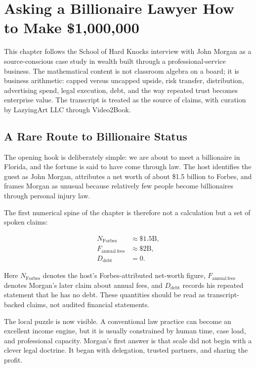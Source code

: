 \chapter{Asking a Billionaire Lawyer How to Make \$1,000,000}

This chapter follows the School of Hard Knocks interview with John Morgan as a source-conscious case study in wealth built through a professional-service business. The mathematical content is not classroom algebra on a board; it is business arithmetic: capped versus uncapped upside, risk transfer, distribution, advertising spend, legal execution, debt, and the way repeated trust becomes enterprise value. The transcript is treated as the source of claims, with curation by LazyingArt LLC through Video2Book.

\section{A Rare Route to Billionaire Status}

The opening hook is deliberately simple: we are about to meet a billionaire in Florida, and the fortune is said to have come through law. The host identifies the guest as John Morgan, attributes a net worth of about \$1.5 billion to Forbes, and frames Morgan as unusual because relatively few people become billionaires through personal injury law.

The first numerical spine of the chapter is therefore not a calculation but a set of spoken claims:

\begin{align}
N_{\mathrm{Forbes}} &\approx \$1.5\mathrm{B},\\
F_{\mathrm{annual\ fees}} &\approx \$2\mathrm{B},\\
D_{\mathrm{debt}} &= 0.
\end{align}

Here \(N_{\mathrm{Forbes}}\) denotes the host's Forbes-attributed net-worth figure, \(F_{\mathrm{annual\ fees}}\) denotes Morgan's later claim about annual fees, and \(D_{\mathrm{debt}}\) records his repeated statement that he has no debt. These quantities should be read as transcript-backed claims, not audited financial statements.

The local puzzle is now visible. A conventional law practice can become an excellent income engine, but it is usually constrained by human time, case load, and professional capacity. Morgan's first answer is that scale did not begin with a clever legal doctrine. It began with delegation, trusted partners, and sharing the profit.


